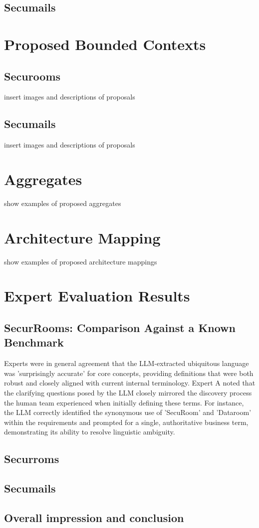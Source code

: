 \subsection{Secumails}

\section{Proposed Bounded Contexts}

\subsection{Securooms}
insert images and descriptions of proposals
\subsection{Secumails}
insert images and descriptions of proposals

\section{Aggregates}

show examples of proposed aggregates

\section{Architecture Mapping}

show examples of proposed architecture mappings

\section{Expert Evaluation Results}

\subsection{SecurRooms: Comparison Against a Known Benchmark}

Experts were in general agreement that the LLM-extracted ubiquitous language was 'surprisingly accurate' for core concepts, providing definitions that were both robust and closely aligned with current internal terminology. Expert A noted that the clarifying questions posed by the LLM closely mirrored the discovery process the human team experienced when initially defining these terms. For instance, the LLM correctly identified the synonymous use of 'SecuRoom' and 'Dataroom' within the requirements and prompted for a single, authoritative business term, demonstrating its ability to resolve linguistic ambiguity.

\subsection{Securroms}

\subsection{Secumails}

\subsection{Overall impression and conclusion}